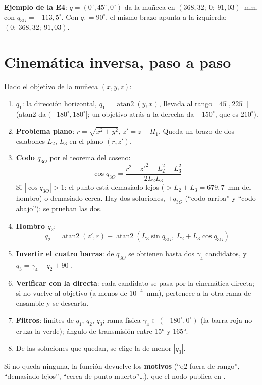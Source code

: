 \textbf{Ejemplo de la E4}: $q = (0^\circ, 45^\circ, 0^\circ)$ da la muñeca en $(368{,}32;\ 0;\ 91{,}03)$~mm, con
$q_{3O} = -113{,}5^\circ$. Con $q_1 = 90^\circ$, el mismo brazo apunta a la izquierda: $(0;\ 368{,}32;\ 91{,}03)$.

\section{Cinemática inversa, paso a paso}

Dado el objetivo de la muñeca $(x, y, z)$:

\begin{enumerate}
  \item \textbf{$q_1$}: la dirección horizontal, $q_1 = \operatorname{atan2}(y, x)$, llevada al rango
        $[45^\circ, 225^\circ]$ (atan2 da $(-180^\circ, 180^\circ]$; un objetivo atrás a la derecha da $-150^\circ$, que es $210^\circ$).
  \item \textbf{Problema plano}: $r = \sqrt{x^2 + y^2}$, $z' = z - H_1$. Queda un brazo de dos eslabones $L_2$, $L_3$ en
        el plano $(r, z')$.
  \item \textbf{Codo $q_{3O}$} por el teorema del coseno:
        \[ \cos q_{3O} = \frac{r^2 + z'^2 - L_2^2 - L_3^2}{2 L_2 L_3} \]
        Si $|\cos q_{3O}| > 1$: el punto está demasiado lejos ($> L_2 + L_3 = 679{,}7$~mm del hombro) o demasiado cerca.
        Hay dos soluciones, $\pm q_{3O}$ (``codo arriba'' y ``codo abajo''): se prueban las dos.
  \item \textbf{Hombro $q_2$}:
        \[ q_2 = \operatorname{atan2}(z', r) - \operatorname{atan2}(L_3\sin q_{3O},\ L_2 + L_3\cos q_{3O}) \]
  \item \textbf{Invertir el cuatro barras}: de $q_{3O}$ se obtienen hasta dos $\gamma_4$ candidatos, y
        $q_3 = \gamma_4 - q_2 + 90^\circ$.
  \item \textbf{Verificar con la directa}: cada candidato se pasa por la cinemática directa; si no vuelve al objetivo
        (a menos de $10^{-4}$~mm), pertenece a la otra rama de ensamble y se descarta.
  \item \textbf{Filtros}: límites de $q_1$, $q_2$, $q_3$; rama física $\gamma_4 \in (-180^\circ, 0^\circ)$ (la barra roja no cruza
        la verde); ángulo de transmisión entre 15° y 165°.
  \item De las soluciones que quedan, se elige la de menor $|q_3|$.
\end{enumerate}

Si no queda ninguna, la función devuelve los \textbf{motivos} (``q2 fuera de rango'', ``demasiado lejos'',
``cerca de punto muerto''\ldots), que el nodo publica en .

